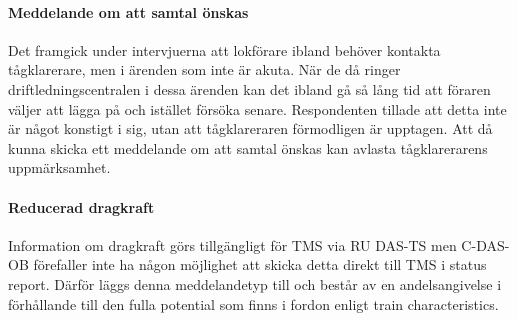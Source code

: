 \paragraph{Meddelande om att samtal önskas}
Det framgick under intervjuerna att lokförare ibland behöver kontakta tågklarerare, men i ärenden som inte är akuta.
När de då ringer driftledningscentralen i dessa ärenden kan det ibland gå så lång tid att föraren väljer att lägga på och istället försöka senare.
Respondenten tillade att detta inte är något konstigt i sig, utan att tågklareraren förmodligen är upptagen.
Att då kunna skicka ett meddelande om att samtal önskas kan avlasta tågklarerarens uppmärksamhet.
\paragraph{Reducerad dragkraft}
Information om dragkraft görs tillgängligt för TMS via RU DAS-TS men C-DAS-OB förefaller inte ha någon möjlighet att skicka detta direkt till TMS i status report.
Därför läggs denna meddelandetyp till och består av en andelsangivelse i förhållande till den fulla potential som finns i fordon enligt train characteristics.
